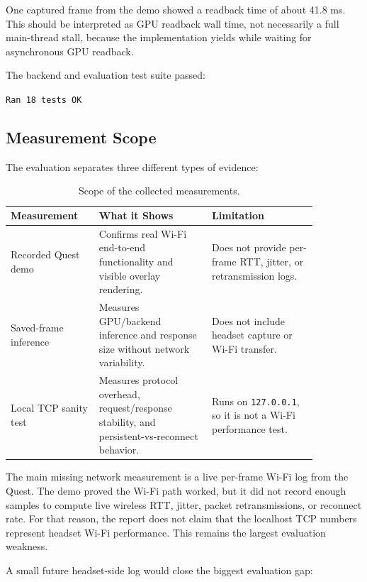 \documentclass[11pt]{article}
\begin{document}
One captured frame from the demo showed a readback time of about 41.8 ms. This should be interpreted as GPU readback wall time, not necessarily a full main-thread stall, because the implementation yields while waiting for asynchronous GPU readback.

The backend and evaluation test suite passed:

\begin{center}
\texttt{Ran 18 tests \quad OK}
\end{center}

\subsection{Measurement Scope}

The evaluation separates three different types of evidence:

\begin{table}[h]
\centering
\begin{tabular}{>{\raggedright\arraybackslash}p{0.24\linewidth} >{\raggedright\arraybackslash}p{0.32\linewidth} >{\raggedright\arraybackslash}p{0.30\linewidth}}
\toprule
\textbf{Measurement} & \textbf{What it Shows} & \textbf{Limitation} \\
\midrule
Recorded Quest demo & Confirms real Wi-Fi end-to-end functionality and visible overlay rendering. & Does not provide per-frame RTT, jitter, or retransmission logs. \\
Saved-frame inference & Measures GPU/backend inference and response size without network variability. & Does not include headset capture or Wi-Fi transfer. \\
Local TCP sanity test & Measures protocol overhead, request/response stability, and persistent-vs-reconnect behavior. & Runs on \texttt{127.0.0.1}, so it is not a Wi-Fi performance test. \\
\bottomrule
\end{tabular}
\caption{Scope of the collected measurements.}
\end{table}

The main missing network measurement is a live per-frame Wi-Fi log from the Quest. The demo proved the Wi-Fi path worked, but it did not record enough samples to compute live wireless RTT, jitter, packet retransmissions, or reconnect rate. For that reason, the report does not claim that the localhost TCP numbers represent headset Wi-Fi performance. This remains the largest evaluation weakness.

A small future headset-side log would close the biggest evaluation gap:
\end{document}
